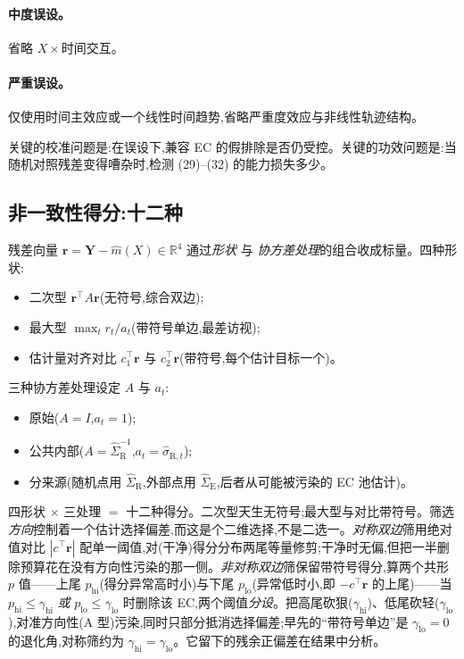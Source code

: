 \documentclass[11pt]{article}
\newcommand{\R}{\mathrm{R}}
\newcommand{\E}{\mathrm{E}}
\begin{document}
\paragraph{中度误设。}
省略 $X\times$时间交互。

\paragraph{严重误设。}
仅使用时间主效应或一个线性时间趋势,省略严重度效应与非线性轨迹结构。

关键的校准问题是:在误设下,兼容 EC 的假排除是否仍受控。关键的功效问题是:当随机对照残差变得嘈杂时,检测 (29)--(32) 的能力损失多少。

\subsection{非一致性得分:十二种}

残差向量 $\bm r=\bm Y-\widehat m(X)\in\mathbb R^4$ 通过\emph{形状} 与 \emph{协方差处理}的组合收成标量。四种形状:
\begin{itemize}
    \item 二次型 $\bm r^{\top}A\bm r$(无符号,综合双边);
    \item 最大型 $\max_t r_t/a_t$(带符号单边,最差访视);
    \item 估计量对齐对比 $c_1^{\top}\bm r$ 与 $c_2^{\top}\bm r$(带符号,每个估计目标一个)。
\end{itemize}
三种协方差处理设定 $A$ 与 $a_t$:
\begin{itemize}
    \item 原始($A=I$,$a_t=1$);
    \item 公共内部($A=\widehat\Sigma_{\R}^{-1}$,$a_t=\widehat\sigma_{\R,t}$);
    \item 分来源(随机点用 $\widehat\Sigma_{\R}$,外部点用 $\widehat\Sigma_{\E}$,后者从可能被污染的 EC 池估计)。
\end{itemize}
四形状 $\times$ 三处理 $=$ 十二种得分。二次型天生无符号;最大型与对比带符号。筛选\emph{方向}控制着一个估计选择偏差,而这是个二维选择,不是二选一。\emph{对称双边}筛用绝对值对比 $|c^{\top}\bm r|$ 配单一阈值,对(干净)得分分布两尾等量修剪;干净时无偏,但把一半删除预算花在没有方向性污染的那一侧。\emph{非对称双边}筛保留带符号得分,算两个共形 $p$ 值——上尾 $p_{\mathrm{hi}}$(得分异常高时小)与下尾 $p_{\mathrm{lo}}$(异常低时小,即 $-c^{\top}\bm r$ 的上尾)——当 $p_{\mathrm{hi}}\le\gamma_{\mathrm{hi}}$ \emph{或} $p_{\mathrm{lo}}\le\gamma_{\mathrm{lo}}$ 时删除该 EC,两个阈值\emph{分设}。把高尾砍狠($\gamma_{\mathrm{hi}}$)、低尾砍轻($\gamma_{\mathrm{lo}}$),对准方向性(A 型)污染,同时只部分抵消选择偏差;早先的``带符号单边''是 $\gamma_{\mathrm{lo}}{=}0$ 的退化角,对称筛约为 $\gamma_{\mathrm{hi}}{=}\gamma_{\mathrm{lo}}$。它留下的残余正偏差在结果中分析。
\end{document}
